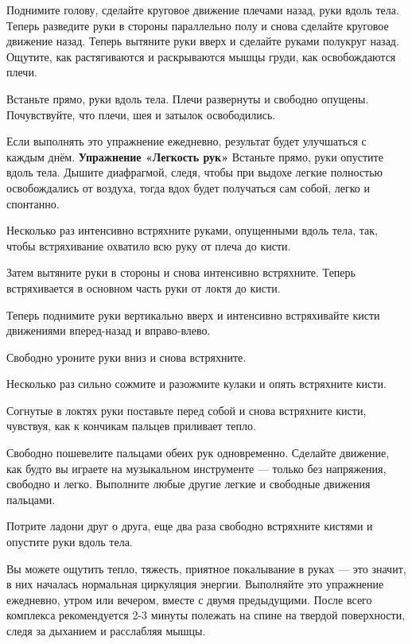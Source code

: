 Поднимите голову, сделайте круговое движение плечами назад, руки вдоль тела. Теперь разведите руки в стороны параллельно полу и снова сделайте круговое движение назад. Теперь вытяните руки вверх и сделайте руками полукруг назад. Ощутите, как растягиваются и раскрываются мышцы груди, как освобождаются плечи.

Встаньте прямо, руки вдоль тела. Плечи развернуты и свободно опущены. Почувствуйте, что плечи, шея и затылок освободились.

Если выполнять это упражнение ежедневно, результат будет улучшаться с каждым днём.
\bigskip
{\bf Упражнение «Легкость рук»}
\medskip
Встаньте прямо, руки опустите вдоль тела. Дышите диафрагмой, следя, чтобы при выдохе легкие полностью освобождались от воздуха, тогда вдох будет получаться сам собой, легко и спонтанно.

Несколько раз интенсивно встряхните руками, опущенными вдоль тела, так, чтобы встряхивание охватило всю руку от плеча до кисти.

Затем вытяните руки в стороны и снова интенсивно встряхните. Теперь встряхивается в основном часть руки от локтя до кисти.

Теперь поднимите руки вертикально вверх и интенсивно встряхивайте кисти движениями вперед-назад и вправо-влево.

Свободно уроните руки вниз и снова встряхните.

Несколько раз сильно сожмите и разожмите кулаки и опять встряхните кисти.

Согнутые в локтях руки поставьте перед собой и снова встряхните кисти, чувствуя, как к кончикам пальцев приливает тепло.

Свободно пошевелите пальцами обеих рук одновременно. Сделайте движение, как будто вы играете на
музыкальном инструменте --- только без напряжения, свободно и легко. Выполните любые другие легкие и свободные движения пальцами.

Потрите ладони друг о друга, еще два раза свободно встряхните кистями и опустите руки вдоль тела.

Вы можете ощутить тепло, тяжесть, приятное покалывание в руках --- это значит, в них началась
нормальная циркуляция энергии.
\bigskip
Выполняйте это упражнение ежедневно, утром или вечером, вместе с двумя предыдущими. После всего комплекса рекомендуется 2-3 минуты полежать на спине на твердой поверхности, следя за дыханием и расслабляя мышцы.
\bye
